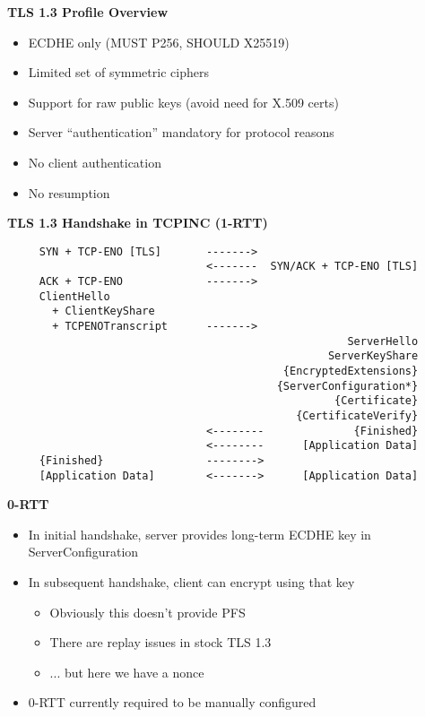 \documentclass[helvetica]{seminar}
\newcommand{\heading}[1]{%
  \begin{center} 
    \large\bf 
    #1 
  \end{center} 
  \vspace{.4 in}}
\begin{document}
\begin{slide}
\heading{TLS 1.3 Profile Overview}

\begin{itemize}
\item ECDHE only (MUST P256, SHOULD X25519)
\item Limited set of symmetric ciphers
\item Support for raw public keys (avoid need for X.509 certs)
\item Server ``authentication'' mandatory for protocol reasons
\item No client authentication
\item No resumption
\end{itemize}
\end{slide}

\begin{slide}
\heading{TLS 1.3 Handshake in TCPINC (1-RTT)}

\begin{scriptsize}
\begin{verbatim}
     SYN + TCP-ENO [TLS]       ------->
                               <-------  SYN/ACK + TCP-ENO [TLS]
     ACK + TCP-ENO             ------->
     ClientHello
       + ClientKeyShare
       + TCPENOTranscript      ------->
                                                     ServerHello
                                                  ServerKeyShare
                                           {EncryptedExtensions}
                                          {ServerConfiguration*}
                                                   {Certificate}
                                             {CertificateVerify}
                               <--------              {Finished}
                               <--------      [Application Data]
     {Finished}                -------->
     [Application Data]        <------->      [Application Data]
\end{verbatim}
\end{scriptsize}
\end{slide}


\begin{slide}
\heading{0-RTT}

\begin{itemize}
\item In initial handshake, server provides long-term ECDHE key in ServerConfiguration
\item In subsequent handshake, client can encrypt using that key
  \begin{itemize}
  \item Obviously this doesn't provide PFS
  \item There are replay issues in stock TLS 1.3
  \item ... but here we have a nonce
  \end{itemize}
\item 0-RTT currently required to be manually configured
\end{itemize}

\end{slide}
\end{document}

